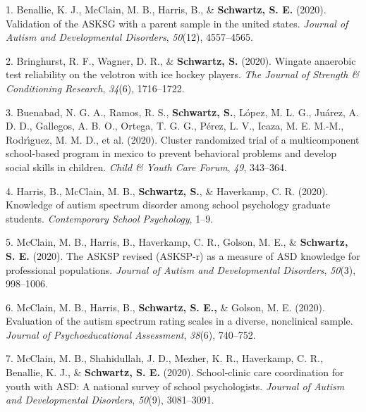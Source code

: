 \documentclass[11pt,a4paper,]{moderncv}
\newlength{\cslhangindent}
\newenvironment{CSLReferences}[2] %
 {\begin{list}{}{%
  \setlength{\itemindent}{0pt}
  \setlength{\leftmargin}{0pt}
  \setlength{\parsep}{0pt}
  \ifodd #1
   \setlength{\leftmargin}{\cslhangindent}
   \setlength{\itemindent}{-1\cslhangindent}
  \fi
  \setlength{\itemsep}{#2\baselineskip}}}
 {\end{list}}
\begin{document}
\label{refs-42fe5200e2060397a1e730ba7472ce80}
\begin{CSLReferences}{1}{0}
1. Benallie, K. J., McClain, M. B., Harris, B., \&
\textbf{Schwartz, S. E.} (2020). Validation of the ASKSG with a parent
sample in the united states. \emph{Journal of Autism and Developmental
Disorders}, \emph{50}(12), 4557--4565.

2. Bringhurst, R. F., Wagner, D. R., \& \textbf{Schwartz, S.} (2020).
Wingate anaerobic test reliability on the velotron with ice hockey
players. \emph{The Journal of Strength \& Conditioning Research},
\emph{34}(6), 1716--1722.

3. Buenabad, N. G. A., Ramos, R. S., \textbf{Schwartz, S.}, López, M. L.
G., Juárez, A. D. D., Gallegos, A. B. O., Ortega, T. G. G., Pérez, L.
V., Icaza, M. E. M.-M., Rodrı́guez, M. M. D., et al. (2020). Cluster
randomized trial of a multicomponent school-based program in mexico to
prevent behavioral problems and develop social skills in children.
\emph{Child \& Youth Care Forum}, \emph{49}, 343--364.

4. Harris, B., McClain, M. B., \textbf{Schwartz, S.}, \& Haverkamp, C.
R. (2020). Knowledge of autism spectrum disorder among school psychology
graduate students. \emph{Contemporary School Psychology}, 1--9.

5. McClain, M. B., Harris, B., Haverkamp, C. R., Golson, M. E., \&
\textbf{Schwartz, S. E.} (2020). The ASKSP revised (ASKSP-r) as a
measure of ASD knowledge for professional populations. \emph{Journal of
Autism and Developmental Disorders}, \emph{50}(3), 998--1006.

6. McClain, M. B., Harris, B., \textbf{Schwartz, S. E.,} \& Golson, M.
E. (2020). Evaluation of the autism spectrum rating scales in a diverse,
nonclinical sample. \emph{Journal of Psychoeducational Assessment},
\emph{38}(6), 740--752.

7. McClain, M. B., Shahidullah, J. D., Mezher, K. R., Haverkamp, C. R.,
Benallie, K. J., \& \textbf{Schwartz, S. E.} (2020). School-clinic care
coordination for youth with ASD: A national survey of school
psychologists. \emph{Journal of Autism and Developmental Disorders},
\emph{50}(9), 3081--3091.


\end{CSLReferences}
\end{document}
